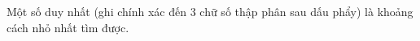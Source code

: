 Một số duy nhất (ghi chính xác đến 3 chữ số thập phân sau dấu phẩy) là khoảng cách nhỏ nhất tìm được.